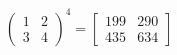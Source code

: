
$$
\begin{pmatrix} 1 & 2 \\ 3 & 4 \end{pmatrix}^4=\begin{bmatrix}199 & 290\\435 & 634\end{bmatrix}
$$

